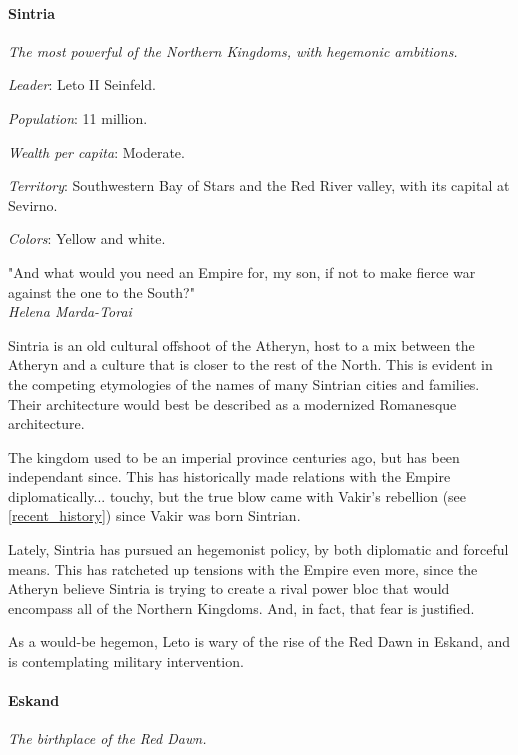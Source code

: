 \paragraph{Sintria}

\textit{The most powerful of the Northern Kingdoms, with hegemonic ambitions.}

\textit{Leader}: Leto II Seinfeld.

\textit{Population}: 11 million.

\textit{Wealth per capita}: Moderate.

\textit{Territory}: Southwestern Bay of Stars and the Red River valley, with its capital at Sevirno.
    
\textit{Colors}: Yellow and white.


\begin{rpg-quotebox}
    "And what would you need an Empire for, my son, if not to make fierce war against the one to the South?" \\ \textendash \textit{Helena Marda-Torai}
\end{rpg-quotebox}


Sintria is an old cultural offshoot of the Atheryn, host to a mix between the Atheryn and a culture that is closer to the rest of the North. This is evident in the competing etymologies of the names of many Sintrian cities and families. Their architecture would best be described as a modernized Romanesque architecture.

The kingdom used to be an imperial province centuries ago, but has been independant since. This has historically made relations with the Empire diplomatically... touchy, but the true blow came with Vakir's rebellion (see \ref{recent_history}) since Vakir was born Sintrian.

Lately, Sintria has pursued an hegemonist policy, by both diplomatic and forceful means. This has ratcheted up tensions with the Empire even more, since the Atheryn believe Sintria is trying to create a rival power bloc that would encompass all of the Northern Kingdoms. And, in fact, that fear is justified.

As a would-be hegemon, Leto is wary of the rise of the Red Dawn in Eskand, and is contemplating military intervention.


\paragraph{Eskand}

\textit{The birthplace of the Red Dawn.}

